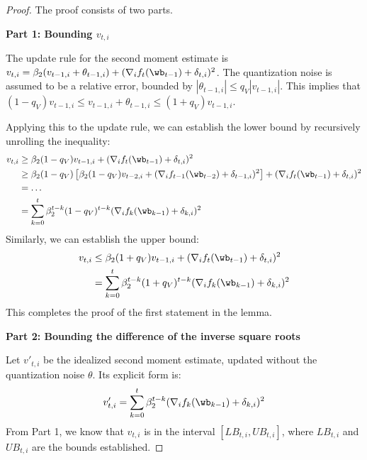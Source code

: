 \documentclass[11pt, letterpaper]{article}
\begin{document}
\begin{proof}
The proof consists of two parts.

\textbf{Part 1: Bounding $v_{t,i}$}

The update rule for the second moment estimate is $v_{t, i} = \beta_2 (v_{t-1, i} + \theta_{t-1,i}) + (\nabla_i f_t(\wb_{t-1}) + \delta_{t,i})^2$. The quantization noise is assumed to be a relative error, bounded by $|\theta_{t-1,i}| \le q_V|v_{t-1,i}|$. This implies that $(1-q_V)v_{t-1,i} \le v_{t-1,i} + \theta_{t-1,i} \le (1+q_V)v_{t-1,i}$.

Applying this to the update rule, we can establish the lower bound by recursively unrolling the inequality:
\begin{align}
    v_{t, i} &\geq\beta_2(1-q_V) v_{t-1, i} + (\nabla_i f_t(\wb_{t-1}) + \delta_{t,i})^2 \nonumber\\
    &\geq\beta_2(1-q_V) \left[ \beta_2(1-q_V)v_{t-2,i} + (\nabla_i f_{t-1}(\wb_{t-2}) + \delta_{t-1,i})^2 \right] + (\nabla_i f_t(\wb_{t-1}) + \delta_{t,i})^2 \nonumber\\
    &= \dots \nonumber\\
    &=\sum_{k=0}^t\beta_2^{t-k}(1-q_V)^{t-k}(\nabla_i f_k(\wb_{k-1}) + \delta_{k,i})^2
\end{align}
Similarly, we can establish the upper bound:
\begin{align}
    v_{t, i} &\le\beta_2(1+q_V) v_{t-1, i} + (\nabla_i f_t(\wb_{t-1}) + \delta_{t,i})^2 \nonumber\\
    &=\sum_{k=0}^t\beta_2^{t-k}(1+q_V)^{t-k}(\nabla_i f_k(\wb_{k-1}) + \delta_{k,i})^2
\end{align}
This completes the proof of the first statement in the lemma.

\textbf{Part 2: Bounding the difference of the inverse square roots}

Let $v'_{t,i}$ be the idealized second moment estimate, updated without the quantization noise $\theta$. Its explicit form is:
\begin{align}
     v'_{t,i} = \sum_{k=0}^t\beta_2^{t-k}(\nabla_i f_k(\wb_{k-1}) + \delta_{k,i})^2
\end{align}
From Part 1, we know that $v_{t,i}$ is in the interval $[LB_{t,i}, UB_{t,i}]$, where $LB_{t,i}$ and $UB_{t,i}$ are the bounds established.


\end{proof}
\end{document}
